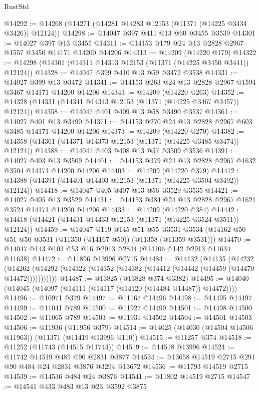 \begin{lexlean}{RustStd}
\begin{coremodule}
@14292 := @14268 (@14271 (@14281 @14283 @12153 (@11371 (@14225 @3434 @3426)) @12124))
@14298 := @14047 @397 @411 @13 @60 @3455 @3539
@14301 := @14027 @397 @13 @3455
@14311 := @14153 @179 @24 @13 @2828 @2967 @1557 @3450 @14171 @14200 @14206
@14313 := @14209 (@14220 @179)
@14322 := @14298 (@14301 (@14311 @14313 @12153 (@11371 (@14225 @3450 @3441)) @12124))
@14328 := @14047 @399 @410 @13 @59 @3472 @3538
@14331 := @14027 @399 @13 @3472
@14341 := @14153 @263 @24 @13 @2828 @2967 @1594 @3467 @14171 @14200 @14206
@14343 := @14209 (@14220 @263)
@14352 := @14328 (@14331 (@14341 @14343 @12153 (@11371 (@14225 @3467 @3457)) @12124))
@14358 := @14047 @401 @409 @13 @58 @3490 @3537
@14361 := @14027 @401 @13 @3490
@14371 := @14153 @270 @24 @13 @2828 @2967 @603 @3485 @14171 @14200 @14206
@14373 := @14209 (@14220 @270)
@14382 := @14358 (@14361 (@14371 @14373 @12153 (@11371 (@14225 @3485 @3474)) @12124))
@14388 := @14047 @403 @408 @13 @57 @3509 @3536
@14391 := @14027 @403 @13 @3509
@14401 := @14153 @379 @24 @13 @2828 @2967 @1632 @3504 @14171 @14200 @14206
@14403 := @14209 (@14220 @379)
@14412 := @14388 (@14391 (@14401 @14403 @12153 (@11371 (@14225 @3504 @3492)) @12124))
@14418 := @14047 @405 @407 @13 @56 @3529 @3535
@14421 := @14027 @405 @13 @3529
@14431 := @14153 @384 @24 @13 @2828 @2967 @1621 @3524 @14171 @14200 @14206
@14433 := @14209 (@14220 @384)
@14442 := @14418 (@14421 (@14431 @14433 @12153 (@11371 (@14225 @3524 @3511)) @12124))
@14459 := @14047
    @119
    @145
    @51
    @55
    @3531
    @3534
    (@14162 @50 @51 @50 @3531 (@11350 (@14167 @50)) (@11358 (@11359 @3531)))
@14470 := @14047 @143 @103 @53 @16 @2913 @2844 (@14106 @142 @2913 @11634 @11638)
@14472 := @11896 @13996 @2715
@14484 := @14132
    (@14135
      (@14232
        (@14262 (@14292 (@14322 (@14352 (@14382 (@14412 (@14442 (@14459 (@14470 @14472)))))))))))
@14487 := @13825 (@13828 @374 @3382)
@14495 := @14040 (@14045 (@14097 (@14111 (@14117 (@14120 (@14484 @14487)) @14472))))
@14496 := @10971 @379
@14497 := @11167 @14496
@14498 := @14495 @14497
@14499 := @11041 @789
@14500 := @11927 @14499
@14501 := @14498 @14500
@14502 := @11065 @789
@14503 := @11931 @14502
@14504 := @14501 @14503
@14506 := @11936 (@11956 @379)
@14514 := @14025 (@14030 (@14504 @14506 @11963)) (@11371 (@11419 @13996 @110))
@14515 := @11257 @374
@14518 := @11252 (@11743 (@14515 @11744))
@14519 := @14518 @13996
@14524 := @11742 @14519 @485 @90 @2831 @3877
@14534 := @13658 @14519 @2715 @291 @90 @484 @24 @2831 @3876 @3294 @13672
@14536 := @11793 @14519 @2715
@14539 := @14536 @484 @24 @3876
@14541 := @11802 @14519 @2715
@14547 := @14541 @433 @483 @13 @23 @3592 @3875

\end{coremodule}
\end{lexlean}

